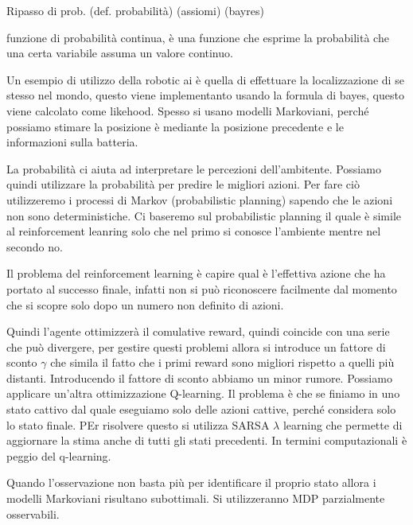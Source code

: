 Ripasso di prob.
(def. probabilità)
(assiomi)
(bayres)


funzione di probabilità continua, è una funzione che esprime la probabilità 
che una certa variabile assuma un valore continuo. 

Un esempio di utilizzo della robotic ai è quella di effettuare la localizzazione 
di se stesso nel mondo, questo viene implementanto usando la formula 
di bayes, questo viene calcolato come likehood. Spesso si usano modelli Markoviani,
perché possiamo stimare la posizione è mediante la posizione precedente e le informazioni 
sulla batteria.

La probabilità ci aiuta ad interpretare le percezioni dell'ambitente. Possiamo 
quindi utilizzare la probabilità per predire le migliori azioni. Per fare ciò utilizzeremo
i processi di Markov (probabilistic planning) sapendo che le azioni non sono 
deterministiche. Ci baseremo sul probabilistic planning il quale è simile al 
reinforcement leanring solo che nel primo si conosce l'ambiente mentre nel secondo no.

Il problema del reinforcement learning è capire qual è l'effettiva azione che ha 
portato al successo finale, infatti non si può riconoscere facilmente dal momento che 
si scopre solo dopo un numero non definito di azioni. 

Quindi l'agente ottimizzerà il comulative reward, quindi coincide con una serie
che può divergere, per gestire questi problemi allora si introduce un fattore di 
sconto $\gamma$ che simila il fatto che i primi reward sono migliori rispetto a quelli 
più distanti. Introducendo il fattore di sconto abbiamo un minor rumore.
Possiamo applicare un'altra ottimizzazione Q-learning. Il problema è che se finiamo 
in uno stato cattivo dal quale eseguiamo solo delle azioni cattive, perché considera 
solo lo stato finale. PEr risolvere questo si utilizza SARSA $\lambda$ learning che 
permette di aggiornare la stima anche di tutti gli stati precedenti.
In termini computazionali è peggio del q-learning.

Quando l'osservazione non basta più per identificare il proprio stato allora i modelli 
Markoviani risultano subottimali. Si utilizzeranno MDP parzialmente osservabili.